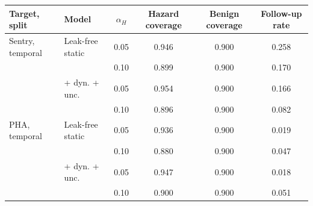 \begin{tabular}{llcccc}
\toprule
Target, split & Model & $\alpha_H$ & Hazard coverage & Benign coverage & Follow-up rate\\
\midrule
Sentry, temporal & Leak-free static & 0.05 & 0.946 & 0.900 & 0.258\\
 &  & 0.10 & 0.899 & 0.900 & 0.170\\
 & + dyn. + unc. & 0.05 & 0.954 & 0.900 & 0.166\\
 &  & 0.10 & 0.896 & 0.900 & 0.082\\
\midrule
PHA, temporal & Leak-free static & 0.05 & 0.936 & 0.900 & 0.019\\
 &  & 0.10 & 0.880 & 0.900 & 0.047\\
 & + dyn. + unc. & 0.05 & 0.947 & 0.900 & 0.018\\
 &  & 0.10 & 0.900 & 0.900 & 0.051\\
\bottomrule
\end{tabular}
